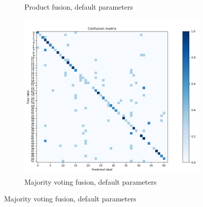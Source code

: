 \documentclass[10pt,technote]{IEEEtran}
\begin{document}
\begin{figure}
\begin{subfigure}[b]{0.3\textwidth}
        \caption{Product fusion, default parameters}
    \end{subfigure}  
    \begin{subfigure}[b]{0.3\textwidth}
        \includegraphics[width=\textwidth]{../results/ex2LDAEnsemble/all_rand_maj_conf.png}
        \caption{Majority voting fusion, default parameters}
    \end{subfigure}    
    \label{fig:conf_matrix_ensemble}
    
    
\end{figure}


%
%
\end{document}
